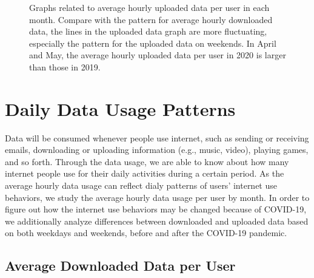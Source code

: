 \begin{figure}[t]
{    }
    \hspace{0.2cm}
        
    \caption{Graphs related to average hourly uploaded data per user in each month.           Compare with the pattern for average hourly downloaded data, the lines in the         uploaded data graph are more fluctuating, especially the pattern for the uploaded     data on weekends. In April and May, the average hourly uploaded data per user in      2020 is larger than those in 2019.
    }
  \label{fig:upload_data_per_user_hours_fig} 
\end{figure}


\section{Daily Data Usage Patterns}

Data will be consumed whenever people use internet, such as sending or receiving emails, downloading or uploading information (e.g., music, video), playing games, and so forth.
Through the data usage, we are able to know about how many internet people use for their daily activities during a certain period. As the average hourly data usage can reflect dialy patterns of users’ internet use behaviors, we study the average hourly data usage per user by month. In order to figure out how the internet use behaviors may be changed because of COVID-19, we additionally analyze differences between downloaded and uploaded data based on both weekdays and weekends, before and after the COVID-19 pandemic.

\subsection{Average Downloaded Data per User}
\label{sec:download-data-per-user-over-hours}

